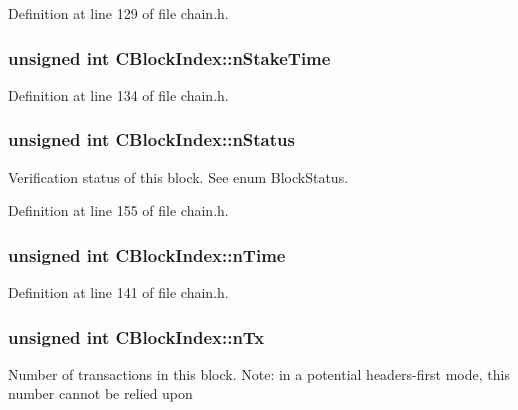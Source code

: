 Definition at line 129 of file chain.\+h.

\hypertarget{class_c_block_index_ae6870336a5bf237680502fa067262af8}{}
\subsubsection[{n\+Stake\+Time}]{\setlength{\rightskip}{0pt plus 5cm}unsigned int C\+Block\+Index\+::n\+Stake\+Time}\label{class_c_block_index_ae6870336a5bf237680502fa067262af8}


Definition at line 134 of file chain.\+h.

\hypertarget{class_c_block_index_ac5a336b45ca70e3ed2fc090bf2ee3011}{}
\subsubsection[{n\+Status}]{\setlength{\rightskip}{0pt plus 5cm}unsigned int C\+Block\+Index\+::n\+Status}\label{class_c_block_index_ac5a336b45ca70e3ed2fc090bf2ee3011}


Verification status of this block. See enum Block\+Status. 



Definition at line 155 of file chain.\+h.

\hypertarget{class_c_block_index_a4b687a226e9e166b0f91c1b616b543a6}{}
\subsubsection[{n\+Time}]{\setlength{\rightskip}{0pt plus 5cm}unsigned int C\+Block\+Index\+::n\+Time}\label{class_c_block_index_a4b687a226e9e166b0f91c1b616b543a6}


Definition at line 141 of file chain.\+h.

\hypertarget{class_c_block_index_ac8e219a377839d2f9133a4387f46e44e}{}
\subsubsection[{n\+Tx}]{\setlength{\rightskip}{0pt plus 5cm}unsigned int C\+Block\+Index\+::n\+Tx}\label{class_c_block_index_ac8e219a377839d2f9133a4387f46e44e}
Number of transactions in this block. Note\+: in a potential headers-\/first mode, this number cannot be relied upon 

